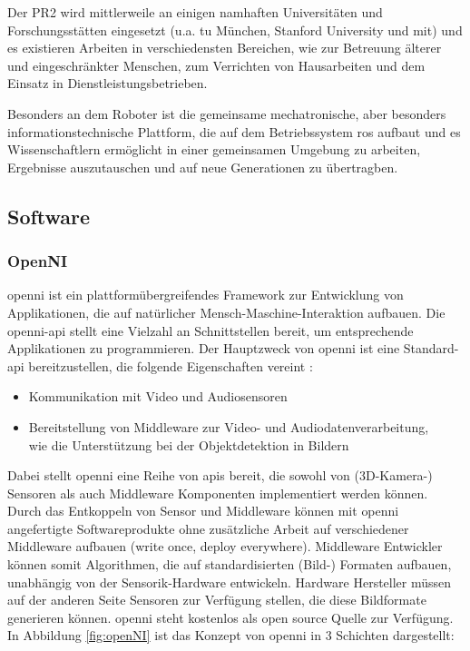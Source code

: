 Der PR2 wird mittlerweile an einigen namhaften Universitäten und Forschungsstätten eingesetzt
 (u.a. \gls{tu} München, Stanford University und \gls{mit}) und es existieren Arbeiten in verschiedensten Bereichen,
 wie zur Betreuung älterer und eingeschränkter Menschen, zum Verrichten von Hausarbeiten  und dem Einsatz
 in Dienstleistungsbetrieben.

Besonders an dem Roboter ist die gemeinsame mechatronische, aber besonders informationstechnische Plattform,
 die auf dem Betriebssystem \gls{ros} aufbaut und es Wissenschaftlern
 ermöglicht in einer gemeinsamen Umgebung zu arbeiten, Ergebnisse auszutauschen und auf neue Generationen zu übertragben.

\subsection{Software}

\subsubsection{OpenNI}

\gls{openni} ist ein plattformübergreifendes Framework zur Entwicklung von
Applikationen, die auf natürlicher Mensch-Maschine-Interaktion aufbauen.
 Die \gls{openni}-\gls{api} stellt eine Vielzahl an Schnittstellen bereit, um
 entsprechende Applikationen zu programmieren. Der Hauptzweck von \gls{openni}
  ist eine Standard-\gls{api} bereitzustellen, die folgende Eigenschaften vereint \citep{openNI2012}:

\begin{itemize}
  \item Kommunikation mit Video und Audiosensoren
  \item Bereitstellung von Middleware zur Video- und Audiodatenverarbeitung,\\
  wie die Unterstützung bei der Objektdetektion in Bildern
\end{itemize}

Dabei stellt \gls{openni} eine Reihe von \glspl{api} bereit, die sowohl von  (3D-Kamera-)
 Sensoren als auch Middleware Komponenten implementiert werden können.
 Durch das Entkoppeln von Sensor und Middleware können mit \gls{openni} angefertigte Softwareprodukte
 ohne zusätzliche Arbeit auf verschiedener Middleware aufbauen (\glqq write once, deploy everywhere\grqq).
 Middleware Entwickler können somit Algorithmen, die auf standardisierten (Bild-) Formaten aufbauen,
 unabhängig von der Sensorik-Hardware entwickeln. Hardware Hersteller müssen auf der anderen Seite
 Sensoren zur Verfügung stellen, die diese Bildformate generieren können. \gls{openni} steht kostenlos
 als open source Quelle zur Verfügung. In Abbildung \ref{fig:openNI} ist das
 Konzept von \gls{openni} in 3 Schichten dargestellt:

